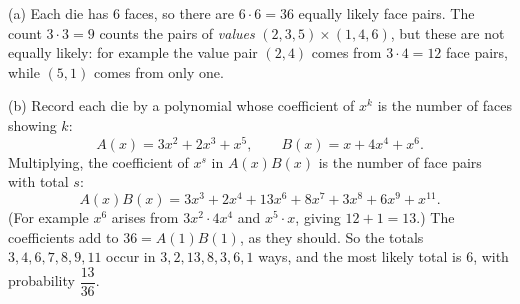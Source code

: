 (a) Each die has $6$ faces, so there are $6\cdot6=\boxed{36}$ equally likely face pairs. The count $3\cdot3=9$ counts the pairs of \emph{values} $(2,3,5)\times(1,4,6)$, but these are not equally likely: for example the value pair $(2,4)$ comes from $3\cdot4=12$ face pairs, while $(5,1)$ comes from only one.

(b) Record each die by a polynomial whose coefficient of $x^k$ is the number of faces showing $k$:
\[A(x)=3x^2+2x^3+x^5,\qquad B(x)=x+4x^4+x^6 .\]
Multiplying, the coefficient of $x^s$ in $A(x)B(x)$ is the number of face pairs with total $s$:
\[A(x)B(x)=3x^3+2x^4+13x^6+8x^7+3x^8+6x^9+x^{11}.\]
(For example $x^6$ arises from $3x^2\cdot4x^4$ and $x^5\cdot x$, giving $12+1=13$.) The coefficients add to $36=A(1)B(1)$, as they should. So the totals $3,4,6,7,8,9,11$ occur in $3,2,13,8,3,6,1$ ways, and the most likely total is $\boxed{6}$, with probability $\dfrac{13}{36}$.

